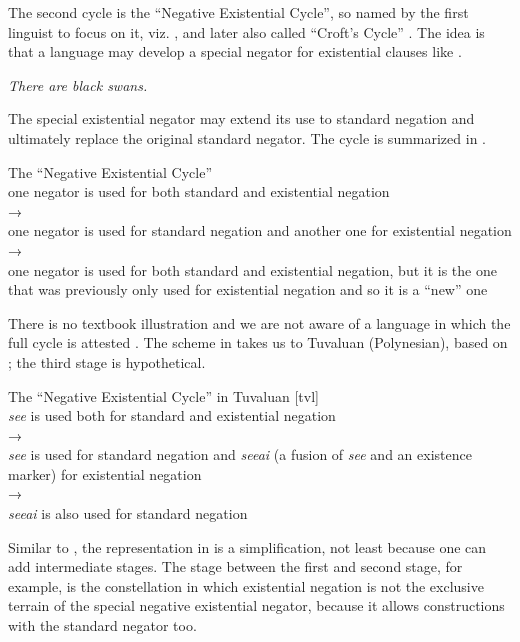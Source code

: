 ﻿\documentclass[output=paper,draft,draftmode,colorlinks,citecolor=brown]{langscibook}
\begin{document}
The second cycle is the ``Negative Existential Cycle'', so named by the
first linguist to focus on it, viz. \textcite[6]{Croft1991}, and later also
called ``Croft's Cycle'' \parencite[e.g.][73]{Kahrel1996}. The idea is that
a language may develop a special negator for existential clauses like
.
%
\begin{exe}\ex\label{ex:int-swans}
    \textit{There are black swans.}
    \end{exe}
%
The special existential negator may extend its use to standard negation and
ultimately replace the original standard negator. The cycle is summarized
in .
%
\begin{exe}\ex\label{ex:int-nec}
          The “Negative Existential Cycle”\\[1ex]
one negator is used for both standard and existential negation  \\
→\\
one negator is used for standard negation and another one for existential
negation\\
→\\
one negator is used for both standard and existential negation, but it is
the one that was previously only used for existential negation and so it is
a ``new'' one
  \end{exe}
%
There is no textbook illustration and we are not aware of a language in
which the full cycle is attested \parencite[see
also][]{Veselinova2014}. The scheme in
 takes us to Tuvaluan (Polynesian),
based on \textcite[1345--1346]{Veselinova2014}; the third stage is
hypothetical.
%
\begin{exe}\ex\label{ex:int-nec-tuvaluan}
          The ``Negative Existential Cycle'' in Tuvaluan [tvl]\\[1ex]
\textit{see} is used both for standard and existential negation\\ 
→\\ 
\textit{see} is used for standard negation and \textit{seeai} (a fusion of
\textit{see} and an existence marker) for existential negation\\
→ \\
\textit{seeai} is also used for standard negation
\end{exe}
%
Similar to , the representation in  is a
simplification, not least because one can add intermediate stages. The
stage between the first and second stage, for example, is the constellation
in which existential negation is not the exclusive terrain of the special
negative existential negator, because it allows constructions with the
standard negator too. 
\end{document}
